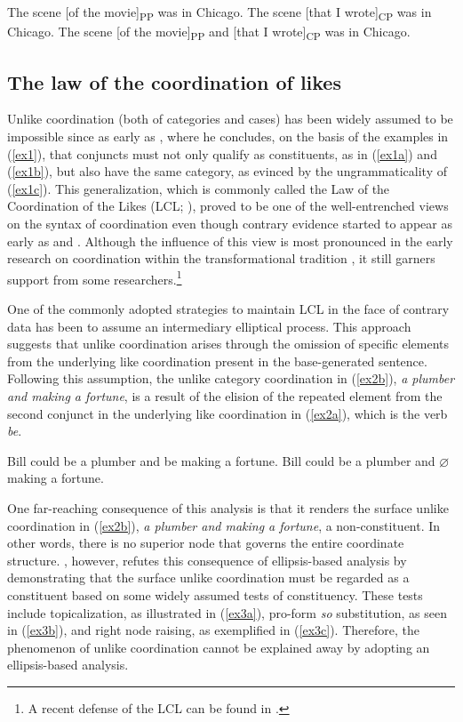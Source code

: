 \pex
\label{ex1}
\a\label{ex1a}The scene [of the movie]\textsubscript{PP} was in Chicago.
\a\label{ex1b}The scene [that I wrote]\textsubscript{CP} was in Chicago.  
\a\label{ex1c}\ljudge{*}The scene [of the movie]\textsubscript{PP} and [that I wrote]\textsubscript{CP} was in Chicago.
\xe

\subsection{The law of the coordination of likes}
Unlike coordination (both of categories and cases) has been widely assumed to be impossible since as early as \citet[pp.\ 35--36]{Chomsky57}, where he concludes, on the basis of the examples in (\ref{ex1}), that conjuncts must not only qualify as constituents, as in (\ref{ex1a}) and (\ref{ex1b}), but also have the same category, as evinced by the ungrammaticality of (\ref{ex1c}). This generalization, which is commonly called the Law of the Coordination of the Likes (LCL; \citealp{Wiliams1981}), proved to be one of the well-entrenched views on the syntax of coordination even though contrary evidence started to appear as early as \citet{dik1968} and \citet{peterson1981}. Although the influence of this view is most pronounced in the early research on coordination within the transformational tradition \citep{schachter1977, Wiliams1981}, it still garners support from some researchers.\footnote{A recent defense of the LCL can be found in \citet{Bruening2020}.}

One of the commonly adopted strategies to maintain LCL in the face of contrary data has been to assume an intermediary elliptical process. This approach suggests that unlike coordination arises through the omission of specific elements from the underlying like coordination present in the base-generated sentence. Following this assumption, the unlike category coordination in (\ref{ex2b}), \textit{a plumber and making a fortune}, is a result of the elision of the repeated element from the second conjunct in the underlying like coordination in (\ref{ex2a}), which is the verb \textit{be}.

\pex 
\label{ex2}
\a\label{ex2a}Bill could be a plumber and be making a fortune.
\a\label{ex2b}Bill could be a plumber and $\varnothing$ making a fortune.  
\xe

One far-reaching consequence of this analysis is that it renders the surface unlike coordination in (\ref{ex2b}), \textit{a plumber and making a fortune}, a non-constituent. In other words, there is no superior node that governs the entire coordinate structure. \citet{peterson2004}, however, refutes this consequence of ellipsis-based analysis by demonstrating that the surface unlike coordination must be regarded as a constituent based on some widely assumed tests of constituency. These tests include topicalization, as illustrated in (\ref{ex3a}), pro-form \textit{so} substitution, as seen in (\ref{ex3b}), and right node raising, as exemplified in (\ref{ex3c}). Therefore, the phenomenon of unlike coordination cannot be explained away by adopting an ellipsis-based analysis.

